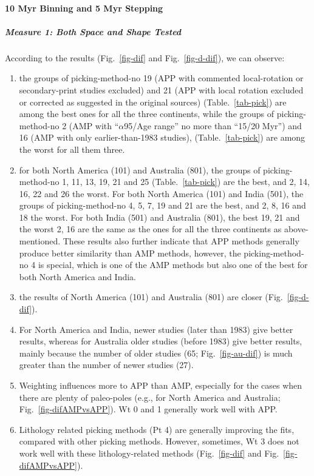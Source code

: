 \paragraph{10 Myr Binning and 5 Myr Stepping}

\subparagraph{Measure 1: Both Space and Shape Tested}

According to the results (Fig.~\ref{fig-dif} and Fig.~\ref{fig-d-dif}), we can
observe:
%
\begin{enumerate}
  \item the groups of picking-method-no 19 (APP with commented local-rotation or
        secondary-print studies excluded) and 21 (APP with local rotation
        excluded or corrected as suggested in the original sources)
        (Table.~\ref{tab-pick}) are among the best ones for all the three
        continents, while the groups of picking-method-no 2 (AMP with
        ``$\alpha$95/Age range'' no more than ``15\degree/20 Myr'') and 16 (AMP
        with only earlier-than-1983 studies), (Table.~\ref{tab-pick}) are among
        the worst for all them three.
  \item for both North America (101) and Australia (801), the groups of
        picking-method-no 1, 11, 13, 19, 21 and 25 (Table.~\ref{tab-pick}) are
        the best, and 2, 14, 16, 22 and 26 the worst. For both North America
		(101) and India (501), the groups of picking-method-no 4, 5, 7, 19 and
		21 are the best, and 2, 8, 16 and 18 the worst. For both India (501)
		and Australia (801), the best 19, 21 and the worst 2, 16 are the same as
		the ones for all the three continents as above-mentioned. These results
		also further indicate that APP methods generally produce better
		similarity than AMP methods, however, the picking-method-no 4 is
		special, which is one of the AMP methods but also one of the best for
		both North America and India.
  \item the results of North America (101) and Australia (801) are closer
		(Fig.~\ref{fig-d-dif}).
  \item For North America and India, newer studies (later than 1983) give
		better results, whereas for Australia older studies (before 1983) give
		better results, mainly because the number of older studies (65;
		Fig.~\ref{fig-au-dif}) is much greater than the number of newer studies
		(27).
  \item Weighting influences more to APP than AMP, especially for the cases
		when there are plenty of paleo-poles (e.g., for North America and
		Australia; Fig.~\ref{fig-difAMPvsAPP}). Wt 0 and 1 generally work well
		with APP.
  \item Lithology related picking methods (Pt 4) are generally
		improving the fits, compared with other picking methods. However,
		sometimes, Wt 3 does not work well with these lithology-related methods
		(Fig.~\ref{fig-dif} and Fig.~\ref{fig-difAMPvsAPP}).
\end{enumerate}

